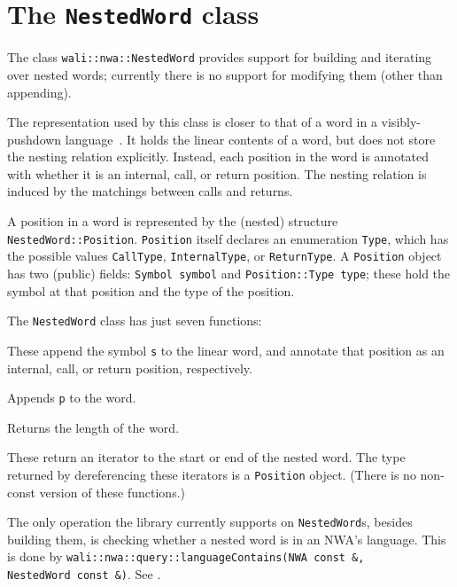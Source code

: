 \section{The \texttt{NestedWord} class}
\label{Se:class-nested-word}

The class \texttt{wali::nwa::NestedWord} provides support for
building and iterating over nested words; currently there
is no support for modifying them (other than appending).

The representation used by this class is closer to that of a word in a
visibly-pushdown language~\cite{JACM:AM2009}. It holds the linear contents of
a word, but does not store the nesting relation explicitly. Instead, each
position in the word is annotated with whether it is an internal, call, or
return position. The nesting relation is induced by the matchings between
calls and returns.

A position in a word is represented by the (nested) structure
\texttt{NestedWord::Position}. \texttt{Position} itself declares an
enumeration \texttt{Type}, which has the possible values \texttt{CallType},
\texttt{InternalType}, or \texttt{ReturnType}.
A \texttt{Position} object has two (public) fields: \texttt{Symbol symbol}
and \texttt{Position::Type type}; these hold the symbol at that position and
the type of the position.


The \texttt{NestedWord} class has just seven functions:
\begin{functionlist}
    These append the symbol \texttt{s} to the linear word, and annotate that
    position as an internal, call, or return position, respectively.

    Appends \texttt{p} to the word.

    Returns the length of the word.

    These return an iterator to the start or end
    of the nested word. The type returned by dereferencing these iterators is
    a \texttt{Position} object. (There is no non-const version of these
    functions.)
\end{functionlist}

The only operation the library currently supports on
\texttt{NestedWord}s, besides building them, is checking whether a
nested word is in an NWA's language. This is done by
\texttt{wali::nwa::query::languageContains(\mbox{NWA const \&}, \mbox{NestedWord const \&})}. See
.

